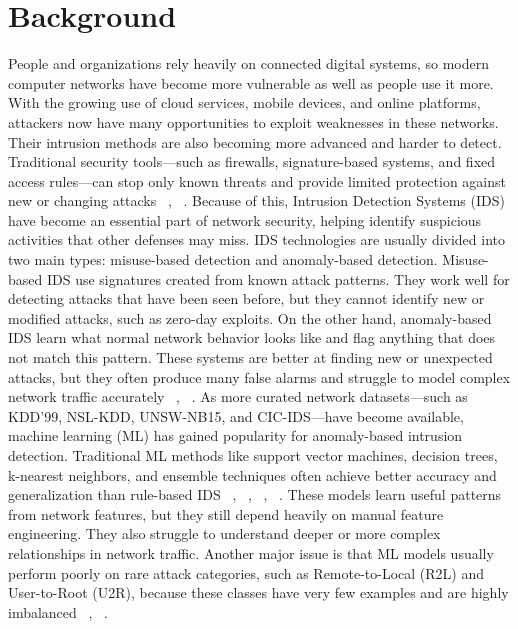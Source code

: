 \section{Background}

People and organizations rely heavily on connected digital systems, so modern computer networks have become more vulnerable as well as people use it more. With the growing use of cloud services, mobile devices, and online platforms, attackers now have many opportunities to exploit weaknesses in these networks. Their intrusion methods are also becoming more advanced and harder to detect. Traditional security tools—such as firewalls, signature-based systems, and fixed access rules—can stop only known threats and provide limited protection against new or changing attacks ~\cite{wu2018novel}, ~\cite{al2021convolutional}. Because of this, Intrusion Detection Systems (IDS) have become an essential part of network security, helping identify suspicious activities that other defenses may miss.
IDS technologies are usually divided into two main types: misuse-based detection and anomaly-based detection. Misuse-based IDS use signatures created from known attack patterns. They work well for detecting attacks that have been seen before, but they cannot identify new or modified attacks, such as zero-day exploits. On the other hand, anomaly-based IDS learn what normal network behavior looks like and flag anything that does not match this pattern. These systems are better at finding new or unexpected attacks, but they often produce many false alarms and struggle to model complex network traffic accurately ~\cite{kim2020cnn}, ~\cite{patel2014machine}.
As more curated network datasets—such as KDD’99, NSL-KDD, UNSW-NB15, and CIC-IDS—have become available, machine learning (ML) has gained popularity for anomaly-based intrusion detection. Traditional ML methods like support vector machines, decision trees, k-nearest neighbors, and ensemble techniques often achieve better accuracy and generalization than rule-based IDS ~\cite{zamani2013machine}, ~\cite{alkasassbeh2018machine}, ~\cite{ramya2020network}, ~\cite{li2018machine}. These models learn useful patterns from network features, but they still depend heavily on manual feature engineering. They also struggle to understand deeper or more complex relationships in network traffic. Another major issue is that ML models usually perform poorly on rare attack categories, such as Remote-to-Local (R2L) and User-to-Root (U2R), because these classes have very few examples and are highly imbalanced ~\cite{da2019internet}, ~\cite{al2014machine}.

